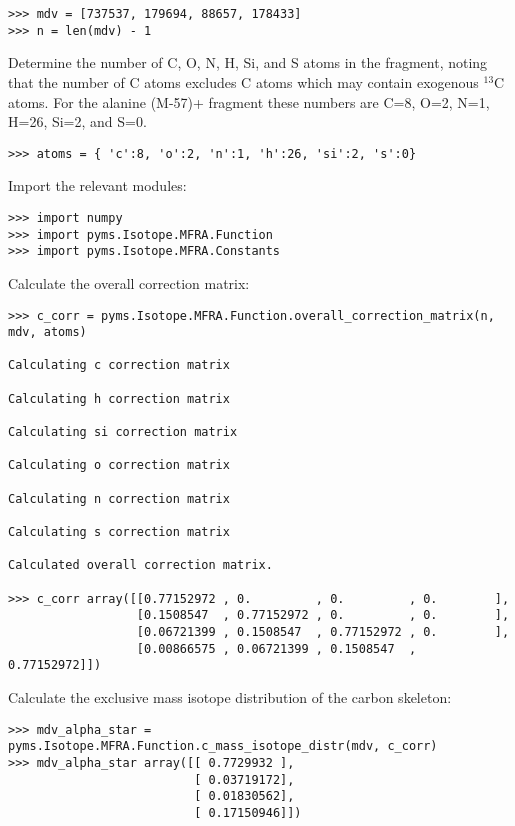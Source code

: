 \begin{verbatim}
>>> mdv = [737537, 179694, 88657, 178433]
>>> n = len(mdv) - 1
\end{verbatim}

Determine the number of C, O, N, H, Si, and S atoms in the fragment,
noting that the number of C atoms excludes C atoms which may contain
exogenous $^{13}$C atoms. For the alanine (M-57)+ fragment these
numbers are C=8, O=2, N=1, H=26, Si=2, and S=0.

\begin{verbatim} 
>>> atoms = { 'c':8, 'o':2, 'n':1, 'h':26, 'si':2, 's':0}
\end{verbatim}

Import the relevant modules:

\begin{verbatim}
>>> import numpy
>>> import pyms.Isotope.MFRA.Function
>>> import pyms.Isotope.MFRA.Constants
\end{verbatim}

Calculate the overall correction matrix:

\begin{verbatim}
>>> c_corr = pyms.Isotope.MFRA.Function.overall_correction_matrix(n, mdv, atoms)

Calculating c correction matrix

Calculating h correction matrix

Calculating si correction matrix

Calculating o correction matrix

Calculating n correction matrix

Calculating s correction matrix

Calculated overall correction matrix.

>>> c_corr array([[0.77152972 , 0.         , 0.         , 0.        ],
                  [0.1508547  , 0.77152972 , 0.         , 0.        ],
                  [0.06721399 , 0.1508547  , 0.77152972 , 0.        ],
                  [0.00866575 , 0.06721399 , 0.1508547  , 0.77152972]])
\end{verbatim}

Calculate the exclusive mass isotope distribution of the carbon skeleton:

\begin{verbatim}
>>> mdv_alpha_star = pyms.Isotope.MFRA.Function.c_mass_isotope_distr(mdv, c_corr)
>>> mdv_alpha_star array([[ 0.7729932 ],
                          [ 0.03719172],
                          [ 0.01830562],
                          [ 0.17150946]])
\end{verbatim}

